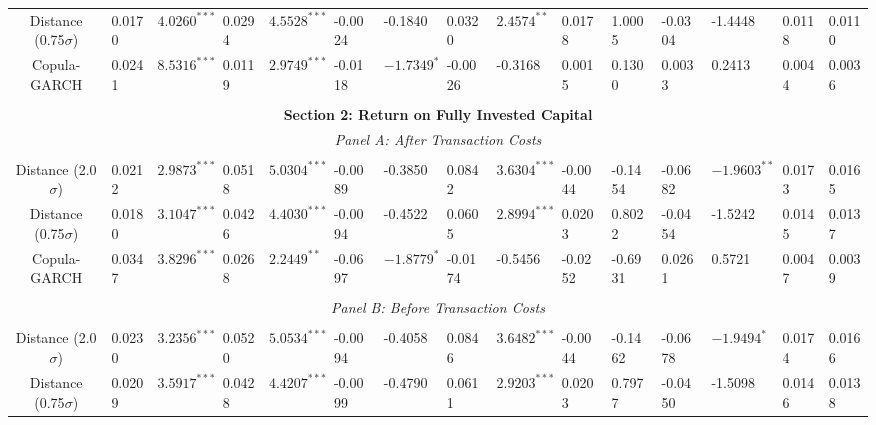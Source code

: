 \documentclass[a4paper]{article}
\begin{document}
\begin{sidewaystable}
\begin{threeparttable}[H]
\begin{tabularx}{\textwidth}{@{\extracolsep{\fill}}lllllllllllllll@{}}
				\multicolumn{1}{c}{Distance (0.75$\sigma$)} & 0.0170 & $4.0260^{***}$ & 0.0294 & $4.5528^{***}$ & -0.0024 & -0.1840 & 0.0320 & $2.4574^{**}$ & 0.0178 & 1.0005 & -0.0304 & -1.4448 & 0.0118 & 0.0110 \\
				\multicolumn{1}{c}{Copula-GARCH} &  0.0241 & $8.5316^{***}$ & 0.0119 & $2.9749^{***}$ & -0.0118 & $-1.7349^{*}$ & -0.0026 & -0.3168 & 0.0015 & 0.1300 & 0.0033 & 0.2413 & 0.0044 & 0.0036 \\
				&       &       &       &       &       &       &       &       &       &       &       &       &       &  \\
				\midrule
				\multicolumn{15}{c}{\textbf{Section 2: Return on Fully Invested Capital}} \\
				\multicolumn{15}{c}{\textit{Panel A: After Transaction Costs}} \\
				&       &       &       &       &       &       &       &       &       &       &       &       &       &  \\
				\multicolumn{1}{c}{Distance (2.0$\sigma$)} & 0.0212 & $2.9873^{***}$ & 0.0518 & $5.0304^{***}$ & -0.0089 & -0.3850 & 0.0842 & $3.6304^{***}$ & -0.0044 & -0.1454 & -0.0682 & $-1.9603^{**}$ & 0.0173 & 0.0165  \\
				\multicolumn{1}{c}{Distance (0.75$\sigma$)} & 0.0180 & $3.1047^{***}$ & 0.0426 & $4.4030^{***}$ & -0.0094 & -0.4522 & 0.0605 & $2.8994^{***}$ & 0.0203 & 0.8022 & -0.0454 & -1.5242 & 0.0145 & 0.0137 \\
				\multicolumn{1}{c}{Copula-GARCH} & 0.0347 & $3.8296^{***}$ & 0.0268 & $2.2449^{**}$ & -0.0697 & $-1.8779^{*}$ & -0.0174 & -0.5456 & -0.0252 & -0.6931 & 0.0261 & 0.5721 & 0.0047 & 0.0039 \\
				&       &       &       &       &       &       &       &       &       &       &       &       &       &  \\
				\multicolumn{15}{c}{\textit{Panel B: Before Transaction Costs}} \\
				&       &       &       &       &       &       &       &       &       &       &       &       &       &  \\
				\multicolumn{1}{c}{Distance (2.0$\sigma$)} & 0.0230 & $3.2356^{***}$ & 0.0520 & $5.0534^{***}$ & -0.0094 & -0.4058 & 0.0846 & $3.6482^{***}$ & -0.0044 & -0.1462 & -0.0678 & $-1.9494^{*}$ & 0.0174 & 0.0166 \\
				\multicolumn{1}{c}{Distance (0.75$\sigma$)} & 0.0209 & $3.5917^{***}$ & 0.0428 & $4.4207^{***}$ & -0.0099 & -0.4790 & 0.0611 & $2.9203^{***}$ & 0.0203 & 0.7977 & -0.0450 & -1.5098 & 0.0146 & 0.0138  \\

\end{tabularx}
\end{threeparttable}
\end{sidewaystable}
\end{document}
